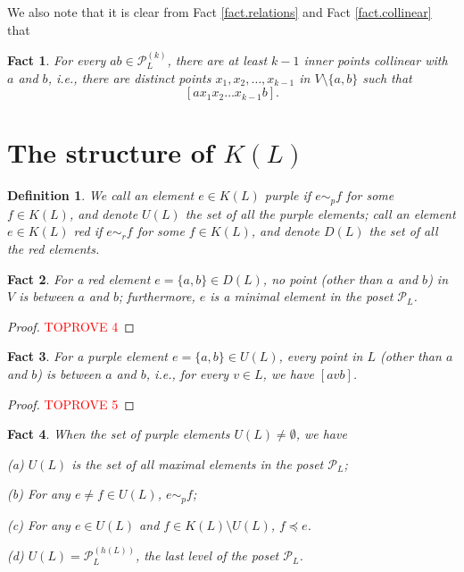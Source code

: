 \documentclass[12pt]{article}
\newtheorem{fact}{Fact}
\newtheorem{defi}{Definition}
\begin{document}
We also note that it is clear from Fact \ref{fact.relations} and Fact \ref{fact.collinear} that

\begin{fact}\label{fact.level_k_inner}
For every $ab \in \mathcal{P}_L^{(k)}$, there are at least $k-1$ inner points collinear with $a$ and $b$,
i.e., there are distinct points $x_1, x_2, \dots, x_{k-1}$ in $V \setminus \{a, b\}$ such that
\[
[a x_1 x_2 \dots x_{k-1} b].
\]
\end{fact}

\section {The structure of $K(L)$}\label{sect.generators}

\begin{defi}
We call an element $e \in K(L)$ purple if 
$e \sim_p f$ for some $f \in K(L)$,
and denote $U(L)$ the set of all the purple elements;
call an element $e \in K(L)$ red if
$e \sim_r f$ for some $f \in K(L)$,
and denote $D(L)$ the set of all the red elements.
\end{defi}

\begin{fact}\label{fact.red_element}
For a red element $e = \{a, b\} \in D(L)$,
no point (other than $a$ and $b$) in $V$ is between $a$ and $b$;
furthermore, $e$ is a minimal element in the poset
$\mathcal{P}_L$.
\end{fact}

\begin{proof}\textcolor{red}{TOPROVE 4}\end{proof}

\begin{fact}\label{fact.purple_basic}
For a purple element $e = \{a, b\} \in U(L)$,
every point in $L$ (other than $a$ and $b$) is between $a$ and $b$,
i.e., for every $v \in L$, we have $[avb]$.
\end{fact}

\begin{proof}\textcolor{red}{TOPROVE 5}\end{proof}

\begin{fact}\label{fact.purple_element}
When the set of purple elements $U(L) \neq \emptyset$, we have

(a) $U(L)$ is the set of all maximal elements in the poset $\mathcal{P}_L$;

(b) For any $e \neq f \in U(L)$, $e \sim_p f$;

(c) For any $e \in U(L)$ and $f \in K(L) \setminus U(L)$, $f \preccurlyeq e$.

(d) $U(L) = \mathcal{P}_L^{(h(L))}$, the last level of the poset $\mathcal{P}_L$.
\end{fact}
\end{document}
